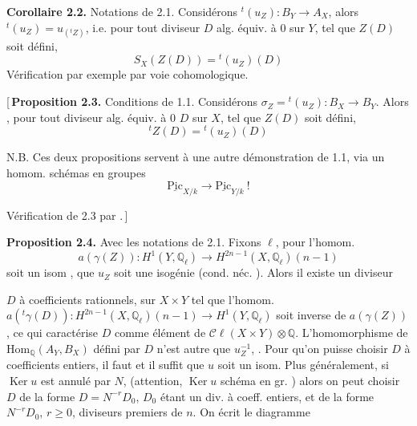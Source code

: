 \documentclass[11pt,a4paper]{article}
\begin{document}

\textbf{Corollaire 2.2.} Notations de 2.1. Considérons ${}^{t}(u_{Z}) : B_{Y} \to A_{X}$, alors
${}^{t}(u_{Z}) = u_{({}^{t}Z)}$, i.e. \ill{} pour tout diviseur $D$ alg. équiv. à $0$ sur $Y$, tel
que $Z(D)$ soit défini,
\[
  S_{X}(Z(D)) = {}^{t}(u_{Z})(D)
\]
Vérification par exemple par voie cohomologique.

[\,\textbf{Proposition 2.3.} Conditions de 1.1.  Considérons
$\sigma_{Z} = {}^{t}(u_{Z}) : B_{X} \to B_{Y}$. Alors \ill{}, pour tout diviseur alg. équiv. à $0$
$D$ sur $X$, tel que $Z(D)$ soit défini,
\[
  {}^{t}Z(D) = {}^{t}(u_{Z})(D)
\]

N.B. Ces deux propositions servent à une autre démonstration de 1.1, via un homom.
 schémas en groupes
\[
  \underline{\mathrm{Pic}}_{X/k} \longrightarrow \underline{\mathrm{Pic}}_{Y/k} \ !
\]

Vérification de 2.3 par .\,]

\textbf{Proposition 2.4.} Avec les notations de 2.1.  Fixons $\ell$,
pour   l'homom.
\[
  a(\gamma(Z)) : H^{1}(Y, \mathbb{Q}_{\ell}) \longrightarrow H^{2n-1}(X, \mathbb{Q}_{\ell})(n-1)
\]
soit un isom \struck{\ill{}},  que $u_{Z}$ soit une isogénie (cond. néc.
). Alors il existe un  diviseur

 $D$ à coefficients rationnels, \struck{\ill{}} sur $X \times Y$ tel que
l'homom. $a({}^{t}\gamma(D)) : H^{2n-1}(X, \mathbb{Q}_{\ell})(n-1) \to H^{1}(Y, \mathbb{Q}_{\ell})$
soit inverse de $a(\gamma(Z))$, ce qui caractérise $D$ comme élément de
$\mathcal{C}\ell(X \times Y) \otimes \mathbb{Q}$.
L'homomorphisme de $\mathrm{Hom}_{\mathbb{Q}}(A_{Y}, B_{X})$ défini par $D$ n'est autre que
$u_{Z}^{-1}$, \struck{\ill{}}. Pour qu'on puisse choisir $D$ à coefficients entiers, il faut et il
suffit que $u$ soit un isom.  Plus généralement, si $\operatorname{Ker} u$
est annulé par $N$, \struck{\ill{}} (attention, $\operatorname{Ker} u$ 
schéma en gr. ) alors on peut choisir $D$ de la forme $D = N^{-r} D_{0}$,
$D_{0}$ étant un div. à coeff. entiers, et \ill{} de la forme $N^{-r} D_{0}$, \ill{} $r \geqslant 0$,
\struck{\ill{}} \ill{} diviseurs premiers de $n$.
On écrit le diagramme 
\end{document}
